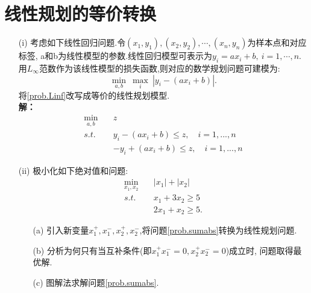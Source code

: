 \documentclass[10pt]{article}
\begin{document}
\section{线性规划的等价转换}
\begin{enumerate}
	\item[(i)]
	考虑如下线性回归问题.令$(x_1, y_1), (x_2, y_2),\cdots,(x_n, y_n)$为样本点和对应标签, a和b为线性模型的参数.线性回归模型可表示为$y_i = a x_i + b,\ i=1,\cdots,n$.
	用$L_{\infty}$范数作为该线性模型的损失函数,则对应的数学规划问题可建模为:
	\begin{equation}\label{prob.Linf}
	\min_{a, b}\ \max_i\ |y_i - (a x_i + b)|.
	\end{equation}
	将\eqref{prob.Linf}改写成等价的线性规划模型.\\

	\Large{\textbf{解：}}
	\begin{equation*}
	\begin{aligned}
		\min_{a, b}\quad &z\\
		s.t.\quad        &y_i-(ax_i+b)\le z,\quad i=1,...,n \\
						 &-y_i+(ax_i+b)\le z,\quad i=1,...,n 
	\end{aligned}
	\end{equation*}


	\item[(ii)]
	极小化如下绝对值和问题:
	\begin{equation}\label{prob.sumabs}
	\begin{aligned}
		\min_{x_1, x_2}\quad &|x_1| + |x_2|\\
		s.t.\quad            &x_1 + 3x_2 \ge 5\\
							 &2x_1 + x_2 \ge 5.
	\end{aligned}
	\end{equation}
	\begin{enumerate}
		\item[(a)] 引入新变量$x_1^+,x_1^-, x_2^+,x_2^-$,将问题\eqref{prob.sumabs}转换为线性规划问题.
		\item[(b)] 分析为何只有当互补条件(即$x_1^+ x_1^-=0, x_2^+ x_2^-=0$)成立时, 问题取得最优解.
		\item[(c)] 图解法求解问题\eqref{prob.sumabs}.\\
	\end{enumerate}


\end{enumerate}
\end{document}
